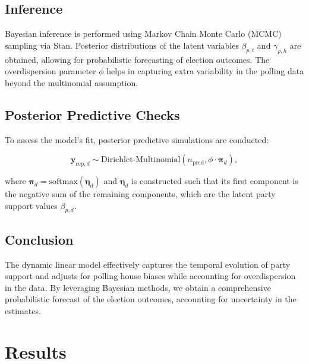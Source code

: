 \documentclass[
  letterpaper,
  DIV=11,
  numbers=noendperiod,
  oneside]{scrartcl}
\begin{document}
\subsection{Inference}\label{inference}

Bayesian inference is performed using Markov Chain Monte Carlo (MCMC)
sampling via Stan. Posterior distributions of the latent variables
\(\beta_{p,t}\) and \(\gamma_{p,h}\) are obtained, allowing for
probabilistic forecasting of election outcomes. The overdispersion
parameter \(\phi\) helps in capturing extra variability in the polling
data beyond the multinomial assumption.

\subsection{Posterior Predictive
Checks}\label{posterior-predictive-checks}

To assess the model's fit, posterior predictive simulations are
conducted:

\[
\mathbf{y}_{\text{rep},d} \sim \text{Dirichlet-Multinomial}\left(n_{\text{pred}}, \phi \cdot \boldsymbol{\pi}_{d}\right),
\]

where
\(\boldsymbol{\pi}_{d} = \text{softmax}\left(\boldsymbol{\eta}_{d}\right)\)
and \(\boldsymbol{\eta}_{d}\) is constructed such that its first
component is the negative sum of the remaining components, which are the
latent party support values \(\beta_{p,d}\).

\subsection{Conclusion}\label{conclusion}

The dynamic linear model effectively captures the temporal evolution of
party support and adjusts for polling house biases while accounting for
overdispersion in the data. By leveraging Bayesian methods, we obtain a
comprehensive probabilistic forecast of the election outcomes,
accounting for uncertainty in the estimates.

\section{Results}\label{results}
\end{document}
